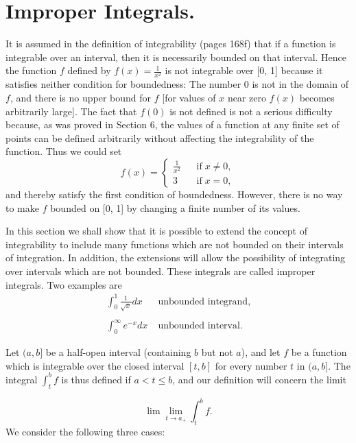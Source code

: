 \section{Improper Integrals.}
It is assumed in the definition of integrability (pages 168f) that if a function is integrable over an interval, then it is necessarily bounded on that interval. Hence the function $f$ defined by $f(x) = \frac{1}{x^2}$ is not integrable over [0, 1] because it satisfies neither condition for boundedness: The number 0 is not in the domain of $f$, and there is no upper bound for $f$ [for values of $x$ near zero $f(x)$ becomes arbitrarily large]. The fact that $f(0)$ is not defined is not a serious difficulty because, as was proved in Section 6, the values of a function at any finite set of points can be defined arbitrarily without affecting the integrability of the function. Thus we could set 
$$
f(x) = \left\{ \begin{array}{ll}
\frac{1}{x^2}\;\;\;&   \mbox{if}\; x \neq 0,\\
3                       &   \mbox{if}\; x = 0,
            \end{array}
\right .
$$
\noindent and thereby satisfy the first condition of boundedness. However, there is no way to make $f$ bounded on [0, 1] by changing a finite number of its values.

In this section we shall show that it is possible to extend the concept of integrability to include many functions which are not bounded on their
intervals of integration. In addition, the extensions will allow the possibility of integrating over intervals which are not bounded. These integrals are called improper integrals. Two examples are
$$
\begin{array}{ll}
\int_0^1 \frac{1}{\sqrt x} dx\; &\mbox{unbounded integrand,}\\ 
&\\
\int_0^\infty e^{-x} dx  \;        &\mbox{unbounded interval. }
\end{array}
$$

Let $(a, b]$ be a half-open interval (containing $b$ but not $a$), and let $f$ be a function which is integrable over the closed interval $[t, b]$ for every number $t$ in $(a, b]$. The integral $\int_t^b f$ is thus defined if $a < t \leq b$, and our definition will concern the limit


\begin{equation}
\lim\lim_{t \rightarrow a_{+}} \int_t^b f.  
\label{eq8.7.1}
\end{equation}
\noindent We consider the following three cases:


